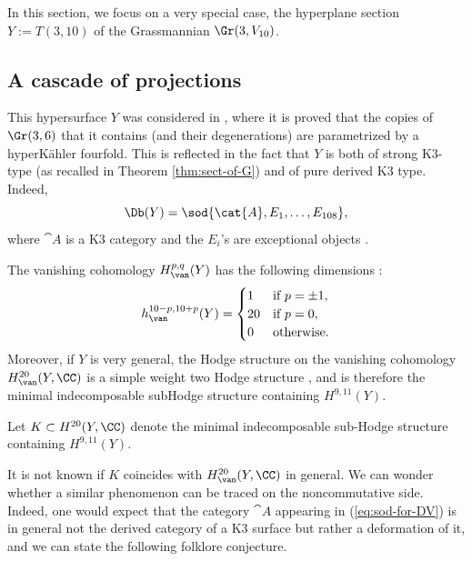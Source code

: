 In this section, we focus on a very special case, the hyperplane section $Y:=T(3,10)$ of
the Grassmannian $\Gr(3,V_{10})$.

\subsection{A cascade of projections}
This hypersurface $Y$ was considered in \cite{debarre-voisin}, where it is proved that the copies
of $\Gr(3,6)$ that it contains (and their degenerations) are parametrized by a hyperKähler fourfold.
This is reflected in the fact that $Y$ is both of strong
K3-type (as recalled in Theorem \ref{thm:sect-of-G}) and of pure derived K3 type. Indeed,\vspace*{-3pt}
\begin{equation}\label{eq:sod-for-DV}
\Db(Y)= \sod{\cat{A},E_1,\ldots,E_{108}},
\end{equation}
where $\cat{A}$ is a K3 category and the $E_i$'s are exceptional objects \cite{kuz-fractional}.

The vanishing cohomology $H^{p,q}_{\van}(Y)$
has the following dimensions \cite{debarre-voisin}:\vspace*{-3pt}\enlargethispage{.5\baselineskip}%
\begin{equation*}\label{eq:Hodge-for-DV}
h_{\van}^{10-p,10+p}(Y) = \begin{cases}
1 & \text{if } p=\pm 1, \\
20 & \text{if } p=0,\\
0 & \text{otherwise.}
\end{cases}
\end{equation*}
Moreover, if $Y$ is very general, the Hodge structure on the vanishing cohomology $H^{20}_{\van}(Y,\CC)$ is a simple weight two Hodge structure \cite[Th.\,2.2]{debarre-voisin},
and is therefore the minimal indecomposable subHodge structure containing $H^{9,11}(Y)$.

\begin{defin}
Let $K \subset H^{20}(Y,\CC)$ denote the minimal indecomposable sub-Hodge structure containing $H^{9,11}(Y)$.
\end{defin}

It is not known if $K$ coincides with $H^{20}_{\van}(Y,\CC)$ in general. We can wonder whether a similar
phenomenon can be traced on the noncommutative side. Indeed, one would expect that the category $\cat{A}$ appearing in (\ref{eq:sod-for-DV})
is in general not the derived category of a K3 surface but rather
a deformation of it, and we can state the following folklore conjecture.


